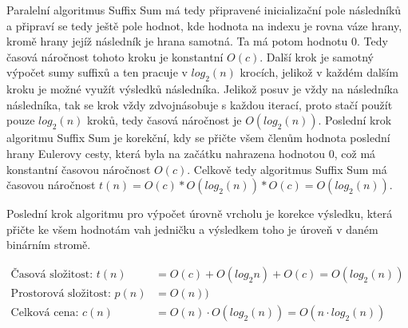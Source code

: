 \documentclass[12pt, a4paper]{article}
\begin{document}
Paralelní algoritmus Suffix Sum má tedy připravené inicializační pole následníků a připraví se tedy ještě pole hodnot, kde hodnota na indexu je rovna váze hrany, kromě hrany jejíž následník je hrana samotná. Ta má potom hodnotu 0. Tedy časová náročnost tohoto kroku je konstantní $O(c)$. Další krok je samotný výpočet sumy suffixů a ten pracuje v $log_{2}(n)$ krocích, jelikož v každém dalším kroku je možné využít výsledků následníka. Jelikož posuv je vždy na následníka následníka, tak se krok vždy zdvojnásobuje s každou iterací, proto stačí použít pouze $log_{2}(n)$ kroků, tedy časová náročnost je $O(log_{2}(n))$. Poslední krok algoritmu Suffix Sum je korekční, kdy se přičte všem členům hodnota poslední hrany Eulerovy cesty, která byla na začátku nahrazena hodnotou 0, což má konstantní časovou náročnost $O(c)$. Celkově tedy algoritmus Suffix Sum má časovou náročnost $t(n)=O(c)*O(log_{2}(n))*O(c)=O(log_{2}(n))$.

Poslední krok algoritmu pro výpočet úrovně vrcholu je korekce výsledku, která přičte ke všem hodnotám vah jedničku a výsledkem toho je úroveň v daném binárním stromě.

\begin{equation}
\begin{split}
\text{Časová složitost: }t(n) &= O(c) + O(log_{2} n) + O(c) = O(log_{2}(n))\\
\text{Prostorová složitost: }p(n) &= O(n))\\
\text{Celková cena: }c(n) &= O(n) \cdot O(log_{2}(n)) = O(n\cdot log_{2}(n))
\end{split}
\end{equation}
\end{document}
